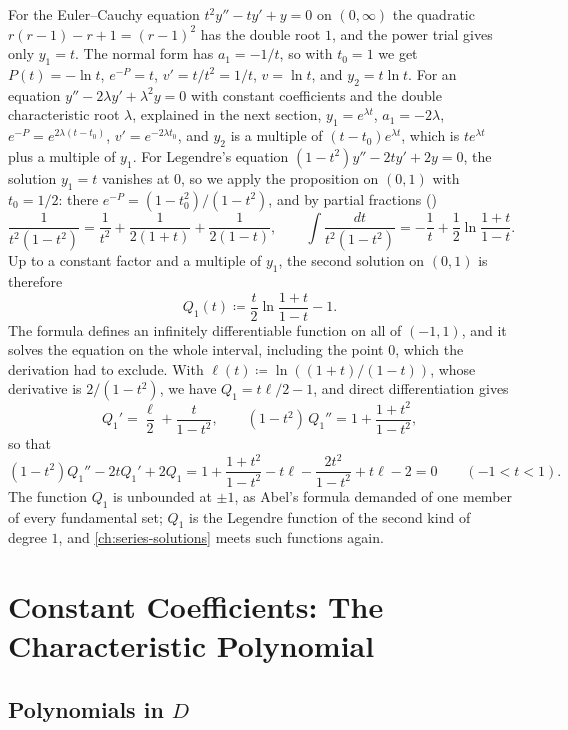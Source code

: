 For the Euler--Cauchy equation $t^2y''-ty'+y=0$ on $(0,\infty)$ the quadratic $r(r-1)-r+1=(r-1)^2$ has the double root $1$, and the power trial gives only $y_1=t$. The normal form has $a_1=-1/t$, so with $t_0=1$ we get $P(t)=-\ln t$, $e^{-P}=t$, $v'=t/t^2=1/t$, $v=\ln t$, and $y_2=t\ln t$. For an equation $y''-2\lambda y'+\lambda^2y=0$ with constant coefficients and the double characteristic root $\lambda$, explained in the next section, $y_1=e^{\lambda t}$, $a_1=-2\lambda$, $e^{-P}=e^{2\lambda(t-t_0)}$, $v'=e^{-2\lambda t_0}$, and $y_2$ is a multiple of $(t-t_0)e^{\lambda t}$, which is $te^{\lambda t}$ plus a multiple of $y_1$. For Legendre's equation $(1-t^2)y''-2ty'+2y=0$, the solution $y_1=t$ vanishes at $0$, so we apply the proposition on $(0,1)$ with $t_0=1/2$: there $e^{-P}=(1-t_0^2)/(1-t^2)$, and by partial fractions ()
\[
\frac1{t^2(1-t^2)}=\frac1{t^2}+\frac1{2(1+t)}+\frac1{2(1-t)},\qquad\int\frac{dt}{t^2(1-t^2)}=-\frac1t+\frac12\ln\frac{1+t}{1-t}.
\]
Up to a constant factor and a multiple of $y_1$, the second solution on $(0,1)$ is therefore
\[
Q_1(t)\coloneqq\frac t2\ln\frac{1+t}{1-t}-1 .
\]
The formula defines an infinitely differentiable function on all of $(-1,1)$, and it solves the equation on the whole interval, including the point $0$, which the derivation had to exclude. With $\ell(t)\coloneqq\ln((1+t)/(1-t))$, whose derivative is $2/(1-t^2)$, we have $Q_1=t\ell/2-1$, and direct differentiation gives
\[
Q_1'=\frac\ell2+\frac t{1-t^2},\qquad(1-t^2)\,Q_1''=1+\frac{1+t^2}{1-t^2},
\]
so that
\[
(1-t^2)Q_1''-2tQ_1'+2Q_1=1+\frac{1+t^2}{1-t^2}-t\ell-\frac{2t^2}{1-t^2}+t\ell-2=0\qquad(-1<t<1).
\]
The function $Q_1$ is unbounded at $\pm1$, as Abel's formula demanded of one member of every fundamental set; $Q_1$ is the Legendre function of the second kind of degree $1$, and \cref{ch:series-solutions} meets such functions again.

\section{Constant Coefficients: The Characteristic Polynomial}
\label{sec:constant-coefficients}

\subsection{Polynomials in \texorpdfstring{$D$}{D}}

